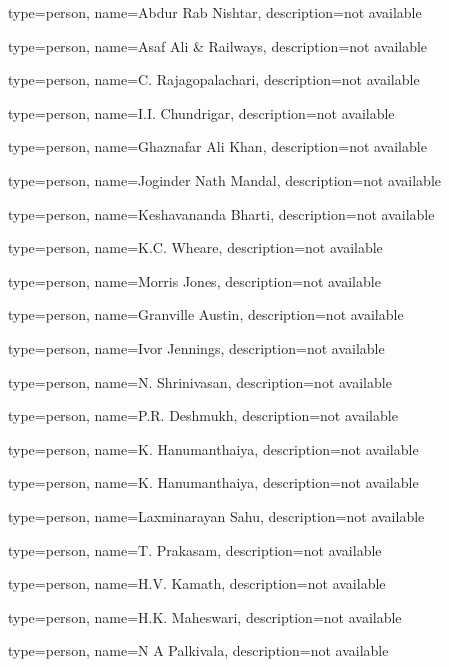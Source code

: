 {	type=person,
  name={Abdur Rab Nishtar},
  description={not available}
}

{	type=person,
  name={Asaf Ali \& Railways},
  description={not available}
}

{	type=person,
  name={C. Rajagopalachari},
  description={not available}
}

{	type=person,
  name={I.I. Chundrigar},
  description={not available}
}

{	type=person,
  name={Ghaznafar Ali Khan},
  description={not available}
}

{	type=person,
  name={Joginder Nath Mandal},
  description={not available}
}

% 

{	type=person,
  name={Keshavananda Bharti},
  description={not available}
}

{	type=person,
  name={K.C. Wheare},
  description={not available}
}

{	type=person,
  name={Morris Jones},
  description={not available}
}

{	type=person,
  name={Granville Austin},
  description={not available}
}

{	type=person,
  name={Ivor Jennings},
  description={not available}
}

{	type=person,
  name={N. Shrinivasan},
  description={not available}
}

{	type=person,
  name={P.R. Deshmukh},
  description={not available}
}

{	type=person,
  name={K. Hanumanthaiya},
  description={not available}
}

{	type=person,
  name={K. Hanumanthaiya},
  description={not available}
}

{	type=person,
  name={Laxminarayan Sahu},
  description={not available}
}

{	type=person,
  name={T. Prakasam},
  description={not available}
}

{	type=person,
  name={H.V. Kamath},
  description={not available}
}

{	type=person,
  name={H.K. Maheswari},
  description={not available}
}


%

{	type=person,
  name={N A Palkivala},
  description={not available}
}

